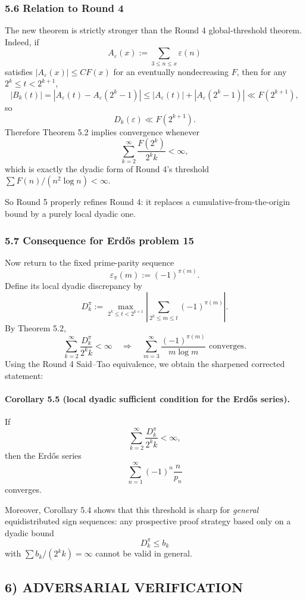 \subsubsection{5.6 Relation to Round 4}

The new theorem is strictly stronger than the Round 4 global-threshold theorem.  Indeed, if
\[
A_\varepsilon(x):=\sum_{3\le n\le x}\varepsilon(n)
\]
satisfies \(|A_\varepsilon(x)|\le C F(x)\) for an eventually nondecreasing \(F\), then for any \(2^k\le t<2^{k+1}\),
\[
|B_k(t)|
=\left|A_\varepsilon(t)-A_\varepsilon(2^k-1)\right|
\le |A_\varepsilon(t)|+|A_\varepsilon(2^k-1)|
\ll F(2^{k+1}),
\]
so
\[
D_k(\varepsilon)\ll F(2^{k+1}).
\]
Therefore Theorem 5.2 implies convergence whenever
\[
\sum_{k=2}^{\infty}\frac{F(2^k)}{2^k k}<\infty,
\]
which is exactly the dyadic form of Round 4's threshold \(\sum F(n)/(n^2\log n)<\infty\).

So Round 5 properly refines Round 4: it replaces a cumulative-from-the-origin bound by a purely local dyadic one.

\subsubsection{5.7 Consequence for Erd\H{o}s problem 15}

Now return to the fixed prime-parity sequence
\[
\varepsilon_\pi(m):=(-1)^{\pi(m)}.
\]
Define its local dyadic discrepancy by
\[
D_k^{\pi}:=\max_{2^k\le t<2^{k+1}}\left|\sum_{2^k\le m\le t}(-1)^{\pi(m)}\right|.
\]
By Theorem 5.2,
\[
\sum_{k=2}^{\infty}\frac{D_k^{\pi}}{2^k k}<\infty
\quad\Longrightarrow\quad
\sum_{m=3}^{\infty}\frac{(-1)^{\pi(m)}}{m\log m}\text{ converges}.
\]
Using the Round 4 Said--Tao equivalence, we obtain the sharpened corrected statement:

\paragraph{Corollary 5.5 (local dyadic sufficient condition for the Erd\H{o}s series).}
If
\[
\sum_{k=2}^{\infty}\frac{D_k^{\pi}}{2^k k}<\infty,
\]
then the Erd\H{o}s series
\[
\sum_{n=1}^{\infty}(-1)^n\frac{n}{p_n}
\]
converges.

Moreover, Corollary 5.4 shows that this threshold is sharp for \emph{general} equidistributed sign sequences: any prospective proof strategy based only on a dyadic bound
\[
D_k^{\pi}\le b_k
\]
with \(\sum b_k/(2^k k)=\infty\) cannot be valid in general.

\subsection{6) ADVERSARIAL VERIFICATION}

